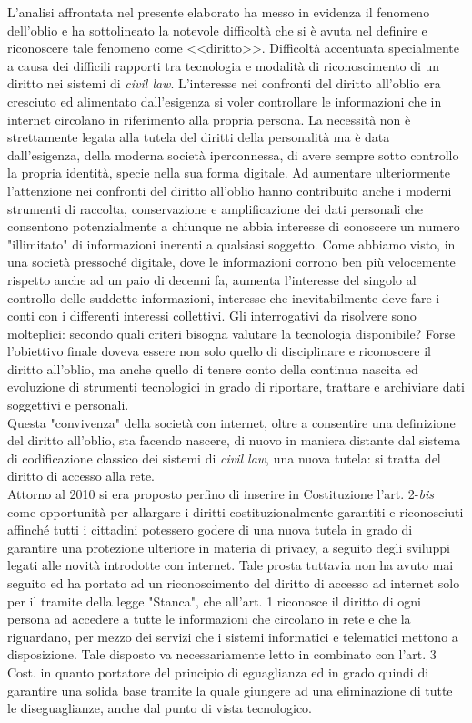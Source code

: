 L'analisi affrontata nel presente elaborato ha messo in evidenza il fenomeno dell'oblio e ha sottolineato la notevole difficoltà che si è avuta nel definire e riconoscere tale fenomeno come <<diritto>>.
Difficoltà accentuata specialmente a causa dei difficili rapporti tra tecnologia e modalità di riconoscimento di un diritto nei sistemi di \textit{civil law}.
L'interesse nei confronti del diritto all'oblio era cresciuto ed alimentato dall'esigenza si voler controllare le informazioni che in internet circolano in riferimento alla propria persona. La necessità non è strettamente legata alla tutela del diritti della personalità ma è data dall'esigenza, della moderna società iperconnessa, di avere sempre sotto controllo la propria identità, specie nella sua forma digitale.
Ad aumentare ulteriormente l'attenzione nei confronti del diritto all'oblio hanno contribuito anche i moderni strumenti di raccolta, conservazione e amplificazione dei dati personali che consentono potenzialmente a chiunque ne abbia interesse di conoscere un numero "illimitato" di informazioni inerenti a qualsiasi soggetto.
Come abbiamo visto, in una società pressoché digitale, dove le informazioni corrono ben più velocemente rispetto anche ad un paio di decenni fa, aumenta l'interesse del singolo al controllo delle suddette informazioni, interesse che inevitabilmente deve fare i conti con i differenti interessi collettivi.
Gli interrogativi da risolvere sono molteplici: secondo quali criteri bisogna valutare la tecnologia disponibile? Forse l'obiettivo finale doveva essere non solo quello di disciplinare e riconoscere il diritto all'oblio, ma anche quello di tenere conto della continua nascita ed evoluzione di strumenti tecnologici in grado di riportare, trattare e archiviare dati soggettivi e personali.
\\Questa "convivenza" della società con internet, oltre a consentire una definizione del diritto all'oblio, sta facendo nascere, di nuovo in maniera distante dal sistema di codificazione classico dei sistemi di \textit{civil law}, una nuova tutela: si tratta del diritto di accesso alla rete.
\\Attorno al 2010 si era proposto perfino di inserire in Costituzione l'art. 2-\textit{bis} come opportunità per allargare i diritti costituzionalmente garantiti e riconosciuti affinché tutti i cittadini potessero godere di una nuova tutela in grado di garantire una protezione ulteriore in materia di privacy, a seguito degli sviluppi legati alle novità introdotte con internet. Tale prosta tuttavia non ha avuto mai seguito ed ha portato ad un riconoscimento del diritto di accesso ad internet solo per il tramite della legge "Stanca", che all'art. 1 riconosce il diritto di ogni persona ad accedere a tutte le informazioni che circolano in rete e che la riguardano, per mezzo dei servizi che i sistemi informatici e telematici mettono a disposizione. Tale disposto va necessariamente letto in combinato con l'art. 3 Cost. in quanto portatore del principio di eguaglianza ed in grado quindi di garantire una solida base tramite la quale giungere ad una eliminazione di tutte le diseguaglianze, anche dal punto di vista tecnologico.
